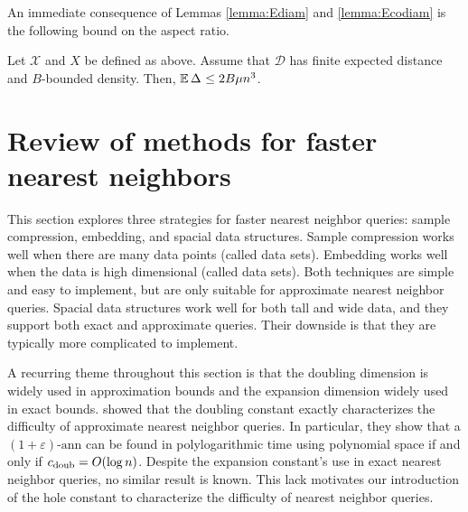 \documentclass[thesis.tex]{subfiles}
\newcommand{\set}[1]{\mathcal {#1}}
\newcommand{\distribution}[1]{\mathcal {#1}}
\newcommand{\aspect}[1]{\Delta_{#1}}
\newcommand{\cdoub}{c_\textnormal{doub}}
\newcommand{\eann}{(1+\varepsilon)\text{-ann}}
\begin{document}
\noindent
An immediate consequence of Lemmas \ref{lemma:Ediam} and \ref{lemma:Ecodiam} is the following bound on the aspect ratio.

\begin{lemma}
    \label{lemma:Easpect}
    Let $\set X$ and $X$ be defined as above.
    Assume that $\distribution D$ has finite expected distance and $B$-bounded density.
    Then, $\E\aspect{} \le2B\mu n^3$.
\end{lemma}


\section{Review of methods for faster nearest neighbors}
\label{sec:review}

This section explores three strategies for faster nearest neighbor queries:
sample compression, embedding, and spacial data structures.
Sample compression works well when there are many data points
(called  data sets).
Embedding works well when the data is high dimensional
(called  data sets).
Both techniques are simple and easy to implement, 
but are only suitable for approximate nearest neighbor queries.
Spacial data structures work well for both tall and wide data,
and they support both exact and approximate queries.
Their downside is that they are typically more complicated to implement.

A recurring theme throughout this section is that the doubling dimension is widely used in approximation bounds and the expansion dimension widely used in exact bounds.
\cite{krauthgamer2005black} showed that the doubling constant exactly characterizes the difficulty of approximate nearest neighbor queries.
In particular, they show that a $\eann$ can be found in polylogarithmic time using polynomial space if and only if $\cdoub = O(\log n)$.
Despite the expansion constant's use in exact nearest neighbor queries,
no similar result is known.
This lack motivates our introduction of the hole constant to characterize the difficulty of nearest neighbor queries.
\end{document}
